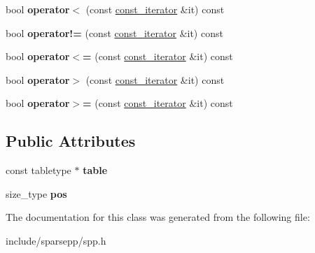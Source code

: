 \begin{DoxyCompactItemize}
\item 
bool {\bfseries operator$<$} (const \hyperlink{classspp___1_1const__table__iterator}{const\+\_\+iterator} \&it) const \hypertarget{classspp___1_1const__table__iterator_a1d4a392f9acc5e9dd06bd8eaa4d24fb4}{}\label{classspp___1_1const__table__iterator_a1d4a392f9acc5e9dd06bd8eaa4d24fb4}

\item 
bool {\bfseries operator!=} (const \hyperlink{classspp___1_1const__table__iterator}{const\+\_\+iterator} \&it) const \hypertarget{classspp___1_1const__table__iterator_a1c043c25e8a1e9147df951ebec3daa3b}{}\label{classspp___1_1const__table__iterator_a1c043c25e8a1e9147df951ebec3daa3b}

\item 
bool {\bfseries operator$<$=} (const \hyperlink{classspp___1_1const__table__iterator}{const\+\_\+iterator} \&it) const \hypertarget{classspp___1_1const__table__iterator_ad5a42d496a1230813b7bc7348d4510de}{}\label{classspp___1_1const__table__iterator_ad5a42d496a1230813b7bc7348d4510de}

\item 
bool {\bfseries operator$>$} (const \hyperlink{classspp___1_1const__table__iterator}{const\+\_\+iterator} \&it) const \hypertarget{classspp___1_1const__table__iterator_afaedfcb112f2644da9f1b69e34e40cd0}{}\label{classspp___1_1const__table__iterator_afaedfcb112f2644da9f1b69e34e40cd0}

\item 
bool {\bfseries operator$>$=} (const \hyperlink{classspp___1_1const__table__iterator}{const\+\_\+iterator} \&it) const \hypertarget{classspp___1_1const__table__iterator_aac90eb30b0ca2df16ed741fecffc2e64}{}\label{classspp___1_1const__table__iterator_aac90eb30b0ca2df16ed741fecffc2e64}

\end{DoxyCompactItemize}
\subsection*{Public Attributes}
\begin{DoxyCompactItemize}
\item 
const tabletype $\ast$ {\bfseries table}\hypertarget{classspp___1_1const__table__iterator_a5d3d20df7097e3280c81beb34abcb424}{}\label{classspp___1_1const__table__iterator_a5d3d20df7097e3280c81beb34abcb424}

\item 
size\+\_\+type {\bfseries pos}\hypertarget{classspp___1_1const__table__iterator_a920e80df06a83ee5a13ae75561f1b85e}{}\label{classspp___1_1const__table__iterator_a920e80df06a83ee5a13ae75561f1b85e}

\end{DoxyCompactItemize}


The documentation for this class was generated from the following file\+:\begin{DoxyCompactItemize}
\item 
include/sparsepp/spp.\+h\end{DoxyCompactItemize}
